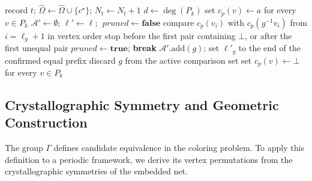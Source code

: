 \documentclass[a5paper, 10pt]{article}
\begin{document}
\begin{algorithm}
\begin{algorithmic}[1]
                \State record $t$; $\widehat{\Omega} \gets \widehat{\Omega} \cup \{c^{\star}\}$; $N_t\gets N_t+1$
            \EndIf
        \EndIf
        \State \Return
    \EndIf
    \State $d \gets \deg(P_k)$
        \State set $c_p(v)\gets a$ for every $v\in P_k$
        \State $\mathcal{A}' \gets \emptyset$; $\boldsymbol{\ell}'\gets\boldsymbol{\ell}$; $\;pruned \gets \textbf{false}$
            \State compare $c_p(v_i)$ with $c_p(g^{-1}v_i)$ from $i=\ell_g+1$ in vertex order
            \State stop before the first pair containing $\bot$, or after the first unequal pair
                \State $pruned \gets \textbf{true}$; \textbf{break}
                \State $\mathcal{A}'.\text{add}(g)$; set $\ell'_g$ to the end of the confirmed equal prefix
            \Else
                \State discard $g$ from the active comparison set
            \EndIf
        \EndFor
            \State {}
        \EndIf
        \State set $c_p(v)\gets\bot$ for every $v\in P_k$
    \EndFor
\EndFunction
\end{algorithmic}
\end{algorithm}

\subsection{Crystallographic Symmetry and Geometric Construction}



\label{sec:reconstruction_method}
The group $\Gamma$ defines candidate equivalence in the coloring problem. To apply this definition to a periodic framework, we derive its vertex permutations from the crystallographic symmetries of the embedded net.
\end{document}
